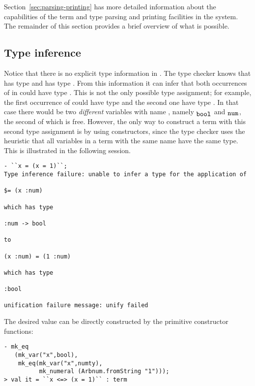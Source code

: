 Section~\ref{sec:parsing-printing} has more detailed information about
the capabilities of the term and type parsing and printing facilities
in the system.  The remainder of this section provides a brief
overview of what is possible.


\subsection{Type inference}
%
Notice that there is no explicit type information in
.  The \HOL{} type checker knows that  has
type  and \holtxt{+} has type .
From this information it can infer that both occurrences of  in
 could have type .  This is not the
only possible type assignment; for example, the first occurrence of
 could have type  and the second one have type
.  In that case there would be two \emph{different}
variables with name , namely $_{\holtxt{bool}}$ and
$_{\holtxt{num}}$, the second of which is free.  However, the
only way to construct a term with this second type assignment is by
using constructors, since the type checker uses the heuristic that all
variables in a term with the same name have the same type.  This is
illustrated in the following session.
%
\setcounter{sessioncount}{0}
\begin{session}
\begin{verbatim}
- ``x = (x = 1)``;
Type inference failure: unable to infer a type for the application of

$= (x :num)

which has type

:num -> bool

to

(x :num) = (1 :num)

which has type

:bool

unification failure message: unify failed
\end{verbatim}
\end{session}

The desired value can be directly constructed by the primitive constructor
functions:

\begin{session}
\begin{verbatim}
- mk_eq
   (mk_var("x",bool),
    mk_eq(mk_var("x",numty),
          mk_numeral (Arbnum.fromString "1")));
> val it = ``x <=> (x = 1)`` : term
\end{verbatim}
\end{session}

